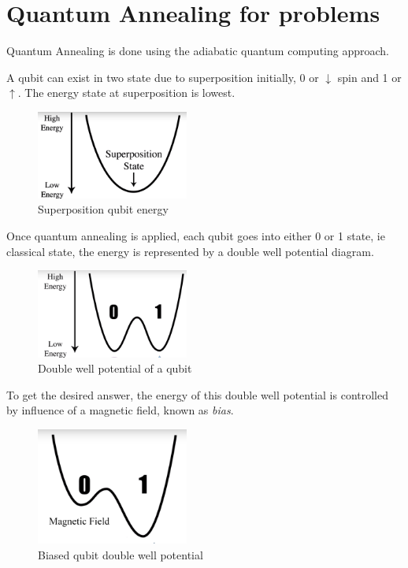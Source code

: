 \documentclass[12pt,conference]{IEEEtran}
\begin{document}
\section{Quantum Annealing for problems} \cite{4}
Quantum Annealing is done using the adiabatic quantum computing approach.

A qubit can exist in two state due to superposition initially, 0 or $\downarrow$  spin and 1 or $\uparrow$. The energy state at superposition is lowest. 
\begin{figure}[h]
  \centering
  \includegraphics[width=5cm]{sp-energy.png}
  \caption{Superposition qubit energy}
  \label{fig:SPQbitE}
\end{figure}

Once quantum annealing is applied, each qubit goes into either 0 or 1 state, ie classical state, the energy is represented by a double well potential diagram.
 
\begin{figure}[h]
  \centering
  \includegraphics[width=5cm]{qubit_energy.png}
  \caption{Double well potential of a qubit}
  \label{fig:DQPQbit}
\end{figure}

To get the desired answer, the energy of this double well potential is controlled by influence of a magnetic field, known as \emph{bias}. 
 
\begin{figure}[h]
  \centering
  \includegraphics[width=5cm]{qubit_mag.png}
  \caption{Biased qubit double well potential}
  \label{fig:BDQPQbit}
\end{figure}
 
\end{document}
